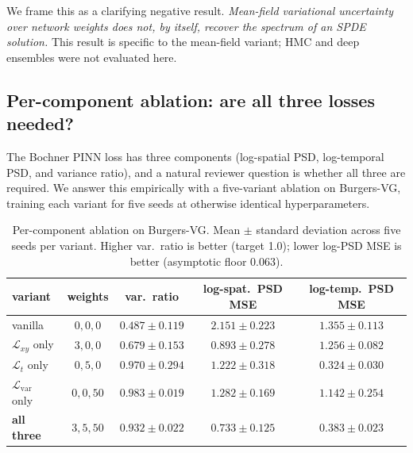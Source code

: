 \documentclass[review,12pt]{elsarticle}
\begin{document}
We frame this as a clarifying negative result. \emph{Mean-field
variational uncertainty over network weights does not, by itself,
recover the spectrum of an SPDE solution.} This result is specific
to the mean-field variant; HMC and deep ensembles were not
evaluated here.

\subsection{Per-component ablation: are all three losses needed?}
\label{subsec:ablation}

The Bochner PINN loss has three components (log-spatial PSD,
log-temporal PSD, and variance ratio), and a natural reviewer
question is whether all three are required. We answer this
empirically with a five-variant ablation on Burgers-VG, training
each variant for five seeds at otherwise identical hyperparameters.

\begin{table}[h]
\centering
\caption{Per-component ablation on Burgers-VG. Mean $\pm$ standard
deviation across five seeds per variant. Higher var.\ ratio is
better (target 1.0); lower log-PSD MSE is better (asymptotic
floor 0.063).}
\label{tab:ablation}
\begin{tabular}{l c c c c}
\toprule
variant & weights & var.\ ratio & log-spat.\ PSD MSE & log-temp.\ PSD MSE \\
\midrule
vanilla             & $0,0,0$  & $0.487 \pm 0.119$ & $2.151 \pm 0.223$ & $1.355 \pm 0.113$ \\
$\mathcal{L}_{xy}$ only     & $3,0,0$  & $0.679 \pm 0.153$ & $0.893 \pm 0.278$ & $1.256 \pm 0.082$ \\
$\mathcal{L}_{t}$ only     & $0,5,0$  & $0.970 \pm 0.294$ & $1.222 \pm 0.318$ & $0.324 \pm 0.030$ \\
$\mathcal{L}_{\mathrm{var}}$ only & $0,0,50$ & $0.983 \pm 0.019$ & $1.282 \pm 0.169$ & $1.142 \pm 0.254$ \\
\textbf{all three}        & $3,5,50$  & $0.932 \pm 0.022$ & $0.733 \pm 0.125$ & $0.383 \pm 0.023$ \\
\bottomrule
\end{tabular}
\end{table}
\end{document}
